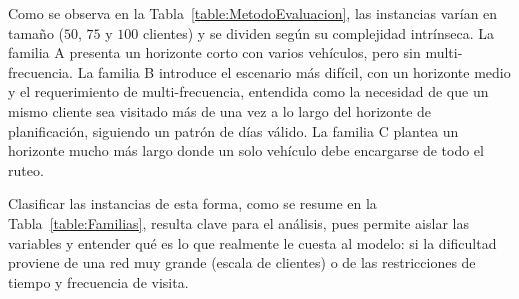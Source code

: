 Como se observa en la Tabla~\ref{table:MetodoEvaluacion}, las instancias varían en tamaño ($50$, $75$ y $100$ clientes) y se dividen según su complejidad intrínseca. La familia A presenta un horizonte corto con varios vehículos, pero sin multi-frecuencia. La familia B introduce el escenario más difícil, con un horizonte medio y el requerimiento de multi-frecuencia, entendida como la necesidad de que un mismo cliente sea visitado más de una vez a lo largo del horizonte de planificación, siguiendo un patrón de días válido. La familia C plantea un horizonte mucho más largo donde un solo vehículo debe encargarse de todo el ruteo.

Clasificar las instancias de esta forma, como se resume en la Tabla~\ref{table:Familias}, resulta clave para el análisis, pues permite aislar las variables y entender qué es lo que realmente le cuesta al modelo: si la dificultad proviene de una red muy grande (escala de clientes) o de las restricciones de tiempo y frecuencia de visita.


